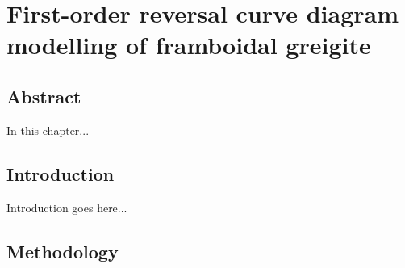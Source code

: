 \chapter{First-order reversal curve diagram modelling of framboidal greigite}
\label{ch:res-4}

\section*{Abstract}
In this chapter...\par

\section{Introduction}
Introduction goes here...\par

\section{Methodology}
